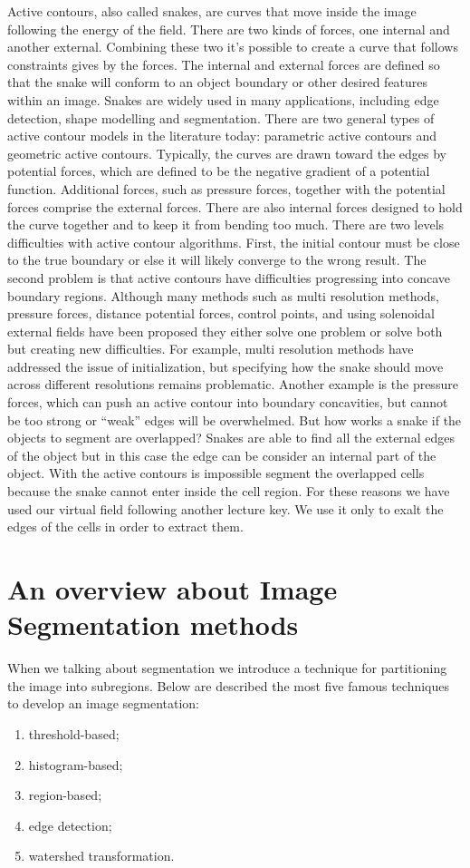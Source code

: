 Active contours, also called snakes, are curves that move inside the image following the energy of the field. There are two kinds of forces, one internal and another external. Combining these two it's possible to create a curve that follows constraints gives by the forces. The  internal  and  external  forces  are  defined  so  that  the  snake  will conform to an object boundary or other desired features within an image. Snakes are widely used  in  many  applications,  including  edge  detection,  shape  modelling and segmentation. There  are  two  general  types  of  active  contour  models  in  the literature  today:  parametric active contours and geometric active contours. Typically,  the  curves  are  drawn  toward  the edges  by  potential  forces,  which  are  defined  to  be  the  negative  gradient  of  a  potential function.  Additional  forces,  such  as  pressure  forces,  together  with  the  potential  forces comprise the external forces. There are also internal forces designed to hold the curve together and to keep it from bending too  much.  There  are  two  levels  difficulties  with  active  contour  algorithms.  First,  the  initial contour must be close to the true boundary or else it will likely converge to the wrong result. The second problem is that active contours have difficulties progressing into concave  boundary  regions.  Although  many  methods  such  as  multi resolution  methods, pressure forces, distance potential forces, control points, and using solenoidal external fields have been proposed they either solve one problem or solve both but creating new difficulties. For  example,  multi resolution  methods  have  addressed  the  issue  of  initialization,  but specifying  how  the  snake  should  move  across  different  resolutions  remains  problematic. Another example is the pressure forces, which can push an active contour into boundary concavities, but cannot be too strong or “weak” edges will be overwhelmed. But how works a snake if the objects to segment are overlapped? Snakes are able to find all the external edges of the object but in this case the edge can be consider an internal part of the object. With the active contours is impossible segment the overlapped cells because the snake cannot enter inside the cell region. For these reasons we have used our virtual field following another lecture key. We use it only to exalt the edges of the cells in order to extract them.

\section{An overview about Image Segmentation methods}
When we talking about segmentation we introduce a technique for partitioning the image into subregions. Below are described the most five famous techniques to develop an image segmentation:
\begin{enumerate}
	\item threshold-based;
	\item histogram-based;
	\item region-based;
	\item edge detection;
	\item watershed transformation.
\end{enumerate}

